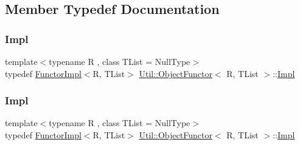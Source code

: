 \subsection{Member Typedef Documentation}
\mbox{\label{classUtil_1_1ObjectFunctor_a93fc635194d1d2768e73ba87d03abd8d}} 
\subsubsection{\texorpdfstring{Impl}{Impl}\hspace{0.1cm}{\footnotesize\ttfamily [1/2]}}
{\footnotesize\ttfamily template$<$typename R , class T\+List  = Null\+Type$>$ \\
typedef \mbox{\hyperlink{classUtil_1_1FunctorImpl}{Functor\+Impl}}$<$R, T\+List$>$ \mbox{\hyperlink{classUtil_1_1ObjectFunctor}{Util\+::\+Object\+Functor}}$<$ R, T\+List $>$\+::\mbox{\hyperlink{classUtil_1_1ObjectFunctor_a93fc635194d1d2768e73ba87d03abd8d}{Impl}}}

\mbox{\label{classUtil_1_1ObjectFunctor_a93fc635194d1d2768e73ba87d03abd8d}} 
\subsubsection{\texorpdfstring{Impl}{Impl}\hspace{0.1cm}{\footnotesize\ttfamily [2/2]}}
{\footnotesize\ttfamily template$<$typename R , class T\+List  = Null\+Type$>$ \\
typedef \mbox{\hyperlink{classUtil_1_1FunctorImpl}{Functor\+Impl}}$<$R, T\+List$>$ \mbox{\hyperlink{classUtil_1_1ObjectFunctor}{Util\+::\+Object\+Functor}}$<$ R, T\+List $>$\+::\mbox{\hyperlink{classUtil_1_1ObjectFunctor_a93fc635194d1d2768e73ba87d03abd8d}{Impl}}}

\mbox{\label{classUtil_1_1ObjectFunctor_a199715d28029627c2ae7219c13b04d26}} 
